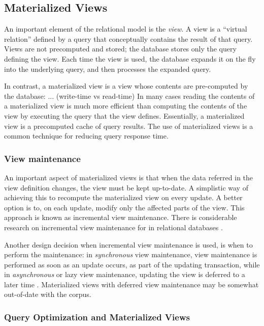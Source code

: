 \subsection{Materialized Views}

An important element of the relational model is the \textit{view}.
A view is a ``virtual relation'' defined by a query that conceptually contains the result of that query.
Views are not precomputed and stored; the database stores only the query defining the view.
Each time the view is used, the database expands it on the fly into the underlying query,
and then processes the expanded query.

In contrast, a materialized view is a view whose contents are pre-computed by the database: ... (write-time vs read-time)
In many cases reading the contents of a materialized view is much more efficient than computing the contents of the view
by executing the query that the view defines.
Essentially, a materialized view is a precomputed cache of query results.
The use of materialized views is a common technique for reducing query response time.

\subsubsection{View maintenance}

An important aspect of materialized views is that when the data referred in the view definition changes,
the view must be kept up-to-date.
A simplistic way of achieving this to recompute the materialized view on every update.
A better option is to, on each update, modify only the affected parts of the view.
This approach is known as incremental view maintenance.
There is considerable research on incremental view maintenance for in relational databases
\cite{larson:outerjoinviewmaintenance, lee:multiplejoinviewmaintenance, zhuge:viewmaintenance}.

Another design decision when incremental view maintenance is used, is when to perform the maintenance:
in \textit{synchronous} view maintenance, view maintenance is performed as soon as an update occurs,
as part of the updating transaction,
while in \textit{asynchronous} or lazy view maintenance,
updating the view is deferred to a later time \cite{zhou:lazymvMaintenance}.
Materialized views with deferred view maintenance may be somewhat out-of-date with the corpus.

\subsubsection{Query Optimization and Materialized Views}


